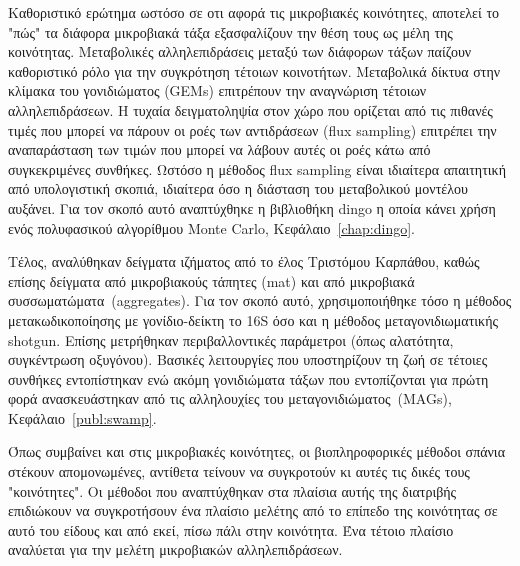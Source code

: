 \documentclass[master=elt, cleveref, autoref, masteroption=eg]{kulemt}
\begin{document}
\begin{abstract*}
   Καθοριστικό ερώτημα ωστόσο σε οτι αφορά τις μικροβιακές κοινότητες, αποτελεί το "πώς" τα διάφορα μικροβιακά τάξα 
   εξασφαλίζουν την θέση τους ως μέλη της κοινότητας. 
   Μεταβολικές αλληλεπιδράσεις μεταξύ των διάφορων τάξων παίζουν καθοριστικό ρόλο για την συγκρότηση 
   τέτοιων κοινοτήτων. 
   Μεταβολικά δίκτυα στην κλίμακα του γονιδιώματος (\foreignlanguage{english}{GEMs}) επιτρέπουν την 
   αναγνώριση τέτοιων αλληλεπιδράσεων. 
   Η τυχαία δειγματοληψία στον χώρο που ορίζεται από τις πιθανές τιμές που μπορεί να πάρουν οι ροές των αντιδράσεων (\foreignlanguage{english}{flux sampling})
   επιτρέπει την αναπαράσταση των τιμών που μπορεί να λάβουν αυτές οι ροές κάτω από συγκεκριμένες συνθήκες. 
   Ωστόσο η μέθοδος \foreignlanguage{english}{flux sampling} είναι ιδιαίτερα απαιτητική από υπολογιστική σκοπιά,
   ιδιαίτερα όσο η διάσταση του μεταβολικού μοντέλου αυξάνει.
   Για τον σκοπό αυτό αναπτύχθηκε η βιβλιοθήκη \foreignlanguage{english}{dingo} η οποία κάνει χρήση ενός 
   πολυφασικού αλγορίθμου \foreignlanguage{english}{Monte Carlo}, Κεφάλαιο~\foreignlanguage{english}{\ref{chap:dingo}}. 

   Τέλος, αναλύθηκαν δείγματα ιζήματος από το έλος Τριστόμου Καρπάθου, καθώς επίσης
   δείγματα από μικροβιακούς τάπητες (\foreignlanguage{english}{mat}) και από μικροβιακά συσσωματώματα~(\foreignlanguage{english}{aggregates}).
   Για τον σκοπό αυτό, χρησιμοποιήθηκε τόσο η μέθοδος μετακωδικοποίησης με γονίδιο-δείκτη το 16\foreignlanguage{english}{S}
   όσο και η μέθοδος μεταγονιδιωματικής \foreignlanguage{english}{shotgun}.
   Επίσης μετρήθηκαν περιβαλλοντικές παράμετροι (όπως αλατότητα, συγκέντρωση οξυγόνου). 
   Βασικές λειτουργίες που υποστηρίζουν τη ζωή σε τέτοιες συνθήκες εντοπίστηκαν 
   ενώ ακόμη γονιδιώματα τάξων που εντοπίζονται για πρώτη φορά ανασκευάστηκαν από τις αλληλουχίες του μεταγονιδιώματος~(\foreignlanguage{english}{MAGs}), Κεφάλαιο~\foreignlanguage{english}{\ref{publ:swamp}}.

   Όπως συμβαίνει και στις μικροβιακές κοινότητες, οι βιοπληροφορικές μέθοδοι σπάνια στέκουν 
   απομονωμένες, αντίθετα τείνουν να συγκροτούν κι αυτές τις δικές τους "κοινότητες". 
   Οι μέθοδοι που αναπτύχθηκαν στα πλαίσια αυτής της διατριβής επιδιώκουν να συγκροτήσουν ένα πλαίσιο μελέτης
   από το επίπεδο της κοινότητας σε αυτό του είδους και από εκεί, πίσω πάλι στην κοινότητα. 
   Ένα τέτοιο πλαίσιο αναλύεται για την μελέτη μικροβιακών αλληλεπιδράσεων. 



\end{abstract*}
\end{document}
